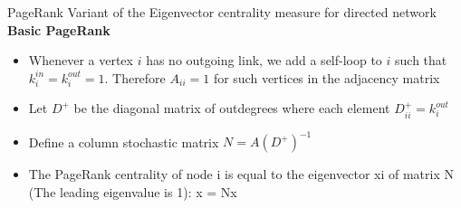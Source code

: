 \documentclass[aspectratio=169]{beamer}
\begin{document}
\begin{frame}{PageRank}
Variant of the Eigenvector centrality measure for directed network
\vfill
\textbf{Basic PageRank}
\begin{itemize}
\item Whenever a vertex $i$ has no outgoing link, we add a self-loop to $i$ such that $k^{in}_i=k^{out}_i=1$. Therefore $A_{ii}=1$ for such vertices in the adjacency matrix
\item Let $D^+$ be the diagonal matrix of outdegrees where each element $D_{ii}^+ = k_i^{out}$
\item Define a column stochastic matrix $N = A(D^+)^{-1}$
\item
The PageRank centrality of node i is equal to the 
eigenvector xi of matrix N (The leading eigenvalue is 1):
x = Nx
\end{itemize}
\end{frame}
\end{document}
